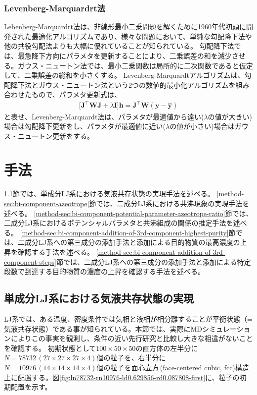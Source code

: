 \documentclass[titlepage]{jsreport}
\begin{document}
\subsection{Levenberg-Marquardrt法}\label{principle-subsec:levenberg-marquardt}
Lebenberg-Marquardrt法は、非線形最小二乗問題を解くために1960年代初頭に開発された最適化アルゴリズムであり、様々な問題において、単純な勾配降下法や他の共役勾配法よりも大幅に優れていることが知られている\cite{levenberg-marquardt}。
勾配降下法では、最急降下方向にパラメタを更新することにより、二乗誤差の和を減少させる。ガウス・ニュートン法では、最小二乗関数は局所的に二次関数であると仮定して、二乗誤差の総和を小さくする。
Levenberg-Marquardtアルゴリズムは、勾配降下法とガウス・ニュートン法という2つの数値的最小化アルゴリズムを組み合わせたもので、パラメタ更新式は、
\large
\begin{eqnarray}
\Big[\bm{J}^\top\bm{W}\bm{J}+\lambda\bm{I}\Big]\bm{h} = \bm{J}^\top\bm{W}(\bm{y}-\bm{\hat{y}})
\end{eqnarray}
\normalsize
と表せ、Levenberg-Marquardt法は、パラメタが最適値から遠い($\lambda$の値が大きい)場合は勾配降下更新をし、パラメタが最適値に近い($\lambda$の値が小さい)場合はガウス・ニュートン更新をする\cite{gradient-descent_gauss-newton_levenberg-marquardt}。


\chapter{手法} \label{chap:method}
\ref{method-sec:mono-component}節では、単成分LJ系における気液共存状態の実現手法を述べる。
\ref{method-sec:bi-component-azeotrope}節では、二成分LJ系における共沸現象の実現手法を述べる。
\ref{method-sec:bi-component-potential-parameter-azeotrope-ratio}節では、二成分LJ系におけるポテンシャルパラメタと共沸組成の関係の推定手法を述べる。
\ref{method-sec:bi-component-addition-of-3rd-component-highest-purity}節では、二成分LJ系への第三成分の添加手法と添加による目的物質の最高濃度の上昇を確認する手法を述べる。
\ref{method-sec:bi-component-addition-of-3rd-component-steps}節では、二成分LJ系への第三成分の添加手法と添加による特定段数で到達する目的物質の濃度の上昇を確認する手法を述べる。


\section{単成分LJ系における気液共存状態の実現} \label{method-sec:mono-component}
LJ系では、ある温度、密度条件では気相と液相が相分離することが平衡状態（=気液共存状態）である事が知られている\cite{gas-liquid-equilibrium}。本節では、実際にMDシミュレーションによりこの事実を観測し、条件の近い先行研究と比較し大きな相違がないことを確認する。
初期状態として$100×50×50$の直方体の左半分に$N=78732\,(27×27×27×4)$個の粒子を、右半分に$N=10976\,(14×14×14×4)$個の粒子を面心立方\,(face-centered cubic, fcc)構造上に配置する。図\ref{fig:ln78732-rn10976-ld0.629856-rd0.087808-first}に、粒子の初期配置を示す。
\end{document}
